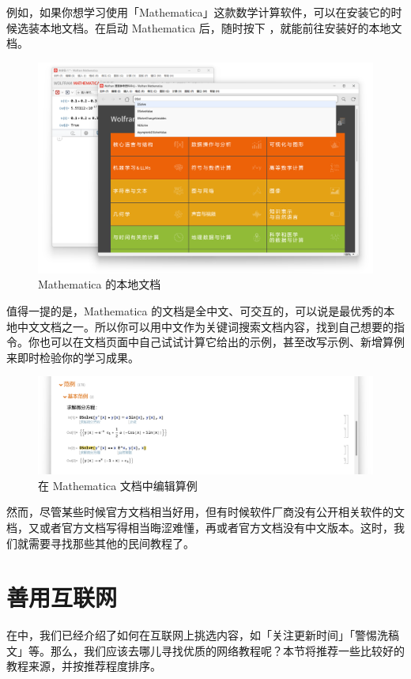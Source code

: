 例如，如果你想学习使用「Mathematica」这款数学计算软件，可以在安装它的时候选装本地文档。在启动 Mathematica 后，随时按下 ，就能前往安装好的本地文档。

\begin{figure}[htb!]
  \centering
  \includegraphics[width=.8\textwidth]{assets/software/MMA_document.png}
  \caption{Mathematica 的本地文档}
  \label{fig:MMA_document}
\end{figure}

值得一提的是，Mathematica 的文档是全中文、可交互的，可以说是最优秀的本地中文文档之一。所以你可以用中文作为关键词搜索文档内容，找到自己想要的指令。你也可以在文档页面中自己试试计算它给出的示例，甚至改写示例、新增算例来即时检验你的学习成果。

\begin{figure}[htb!]
  \centering
  \includegraphics[width=.7\textwidth]{assets/software/MMA_edit_in_document.png}
  \caption{在 Mathematica 文档中编辑算例}
  \label{fig:MMA_edit_in_document}
\end{figure}

然而，尽管某些时候官方文档相当好用，但有时候软件厂商没有公开相关软件的文档，又或者官方文档写得相当晦涩难懂，再或者官方文档没有中文版本。这时，我们就需要寻找那些其他的民间教程了。

\section{善用互联网}

在中，我们已经介绍了如何在互联网上挑选内容，如「关注更新时间」「警惕洗稿文」等。那么，我们应该去哪儿寻找优质的网络教程呢？本节将推荐一些比较好的教程来源，并按推荐程度排序。


